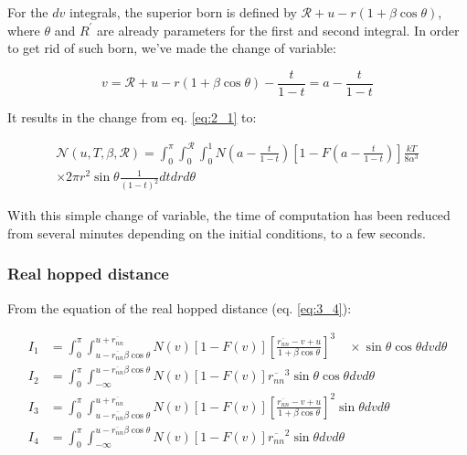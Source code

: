 For the $d v$ integrals, the superior born is defined by $\mathscr{R}+u-r(1+\beta \cos \theta)$, where $\theta$ and $R^\prime$ are already parameters for the first and second integral. In order to get rid of such born, we've made the change of variable:

\begin{equation}
    v = \mathscr{R}+u-r(1+\beta \cos \theta) - \frac{t}{1 - t} = a - \frac{t}{1-t}
    \label{eq:2_2}
\end{equation}

It results in the change from eq. \ref{eq:2_1} to:

\begin{equation}
    \begin{aligned}
    \mathcal{N}\left(u, T, \beta, \mathscr{R}\right)=\int_{0}^{\pi} \int_{0}^{\mathscr{R}} \int_{0}^{1} N\left(a - \frac{t}{1-t}\right)\left[1-F\left(a - \frac{t}{1-t}\right)\right] \frac{k T}{8 \alpha^{3}} \\
    \times 2 \pi r^2 \sin \theta \frac{1}{(1 - t)^2} d t d r d \theta
    \end{aligned}
    \label{eq:2_3}
\end{equation}

With this simple change of variable, the time of computation has been reduced from several minutes depending on the initial conditions, to a few seconds.

\subsubsection{Real hopped distance}

From the equation of the real hopped distance (eq. \ref{eq:3_4}):

\begin{equation}
    \begin{aligned}
    I_{1}&=\int_{0}^{\pi} \int_{u-\overline{r_{n n}} \beta \cos \theta}^{u+\overline{r_{n n}}} N\left(v\right)\left[1-F\left(v\right)\right]\left[\frac{\overline{r_{n n}}-v+u}{1+\beta \cos \theta}\right]^{3} \quad \times \sin \theta \cos \theta d v d \theta \\
    I_{2}&=\int_{0}^{\pi} \int_{-\infty}^{u-\overline{r_{n n}} \beta \cos \theta} N\left(v\right)\left[1-F\left(v\right)\right] \overline{r_{n n}}^{3} \sin \theta \cos \theta d v d \theta \\
    I_{3}&=\int_{0}^{\pi} \int_{u-\overline{r_{n n}} \beta \cos \theta}^{u+\overline{r_{n n}}} N\left(v\right)\left[1-F\left(v\right)\right]\left[\frac{\overline{r_{n n}}-v+u}{1+\beta \cos \theta}\right]^{2} \sin \theta d v d \theta \\
    I_{4}&=\int_{0}^{\pi} \int_{-\infty}^{u-\overline{r_{n n}} \beta \cos \theta} N\left(v\right)\left[1-F\left(v\right)\right] \overline{r_{n n}}^{2} \sin \theta d v d \theta
    \end{aligned}
    \label{eq:2_4}
\end{equation}

